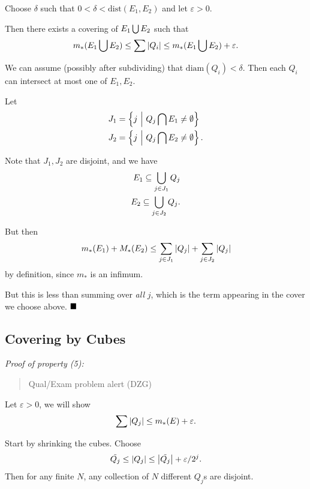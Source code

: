 Choose \(\delta\) such that \(0 < \delta < \mathrm{dist}(E_1, E_2)\) and
let \(\varepsilon > 0\).

Then there exists a covering of \(E_1 \bigcup E_2\) such that
\begin{align*}
m_*(E_1 \bigcup E_2) \leq \sum {\left\lvert {Q_i} \right\rvert} \leq m_*(E_1 \bigcup E_2) + \varepsilon.
\end{align*}

We can assume (possibly after subdividing) that
\(\mathrm{diam}(Q_i) < \delta\). Then each \(Q_i\) can intersect at most
one of \(E_1, E_2\).

Let \begin{align*}
J_1 &= \left\{{j {~\mathrel{\Big|}~} Q_j \bigcap E_1 \neq \emptyset}\right\} \\
J_2 &= \left\{{j {~\mathrel{\Big|}~} Q_j \bigcap E_2 \neq \emptyset}\right\}
.\end{align*}

Note that \(J_1, J_2\) are disjoint, and we have \begin{align*}
E_1 \subseteq \bigcup_{j\in J_1} Q_j \\
E_2 \subseteq \bigcup_{j\in J_2} Q_j
.\end{align*}

But then
\begin{align*}m_*(E_1) + M_*(E_2) \leq \sum_{j\in J_1} {\left\lvert {Q_j} \right\rvert} + \sum_{j\in J_2} {\left\lvert {Q_j} \right\rvert}
\end{align*} by definition, since \(m_*\) is an infimum.

But this is less than summing over \emph{all} \(j\), which is the term
appearing in the cover we choose above. \(\qed\)

\hypertarget{covering-by-cubes}{%
\subsection{Covering by Cubes}\label{covering-by-cubes}}

\emph{Proof of property (5):}

\begin{quote}
Qual/Exam problem alert (DZG)
\end{quote}

Let \(\varepsilon > 0\), we will show
\begin{align*}
\sum {\left\lvert {Q_j} \right\rvert} \leq m_*(E) + \varepsilon
.\end{align*}

Start by shrinking the cubes. Choose
\begin{align*}
\tilde{Q_j} \leq {\left\lvert {Q_j} \right\rvert} \leq {\left\lvert {\tilde{Q_j}} \right\rvert} + \varepsilon /2^j
.\end{align*} Then for any finite \(N\), any collection of \(N\)
different \(Q_j\)s are disjoint.

